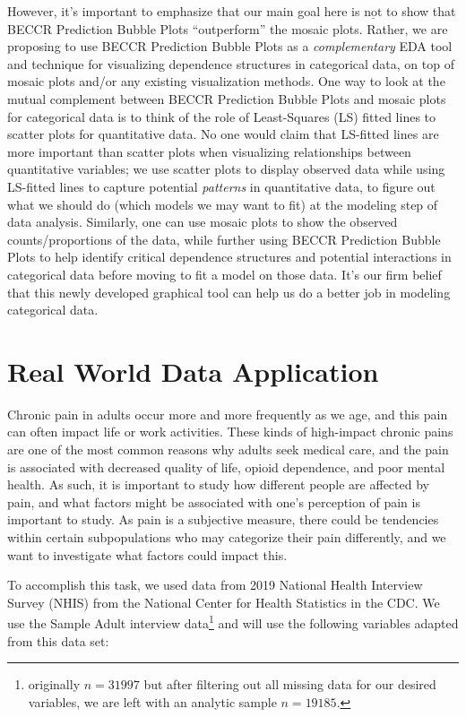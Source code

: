 \documentclass[
]{article}
\begin{document}
However, it's important to emphasize that our main goal here is
\(\underline{\text{not}}\) to show that BECCR Prediction Bubble Plots
``outperform'' the mosaic plots. Rather, we are proposing to use BECCR
Prediction Bubble Plots as a \emph{complementary} EDA tool and technique
for visualizing dependence structures in categorical data, on top of
mosaic plots and/or any existing visualization methods. One way to look
at the mutual complement between BECCR Prediction Bubble Plots and
mosaic plots for categorical data is to think of the role of
Least-Squares (LS) fitted lines to scatter plots for quantitative data.
No one would claim that LS-fitted lines are more important than scatter
plots when visualizing relationships between quantitative variables; we
use scatter plots to display observed data while using LS-fitted lines
to capture potential \emph{patterns} in quantitative data, to figure out
what we should do (which models we may want to fit) at the modeling step
of data analysis. Similarly, one can use mosaic plots to show the
observed counts/proportions of the data, while further using BECCR
Prediction Bubble Plots to help identify critical dependence structures
and potential interactions in categorical data before moving to fit a
model on those data. It's our firm belief that this newly developed
graphical tool can help us do a better job in modeling categorical data.

\newpage

\section{Real World Data Application}\label{real-world-data-application}

Chronic pain in adults occur more and more frequently as we age, and
this pain can often impact life or work activities. These kinds of
high-impact chronic pains are one of the most common reasons why adults
seek medical care, and the pain is associated with decreased quality of
life, opioid dependence, and poor mental health. As such, it is
important to study how different people are affected by pain, and what
factors might be associated with one's perception of pain is important
to study. As pain is a subjective measure, there could be tendencies
within certain subpopulations who may categorize their pain differently,
and we want to investigate what factors could impact this.

To accomplish this task, we used data from 2019 National Health
Interview Survey (NHIS) from the National Center for Health Statistics
in the CDC. We use the Sample Adult interview data\footnote{originally
  \(n=31997\) but after filtering out all missing data for our desired
  variables, we are left with an analytic sample \(n=19185\).} and will
use the following variables adapted from this data set:
\end{document}
